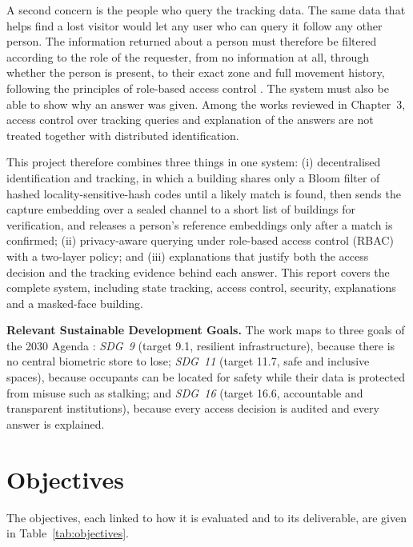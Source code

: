 \documentclass[12pt,a4paper,oneside]{report}
\begin{document}
A second concern is the people who query the tracking data. The same data that helps find a lost visitor would let any user who can query it follow any other person. The information returned about a person must therefore be filtered according to the role of the requester, from no information at all, through whether the person is present, to their exact zone and full movement history, following the principles of role-based access control \cite{ref21}. The system must also be able to show why an answer was given. Among the works reviewed in Chapter~3, access control over tracking queries and explanation of the answers are not treated together with distributed identification.

This project therefore combines three things in one system: (i) decentralised identification and tracking, in which a building shares only a Bloom filter of hashed locality-sensitive-hash codes until a likely match is found, then sends the capture embedding over a sealed channel to a short list of buildings for verification, and releases a person's reference embeddings only after a match is confirmed; (ii) privacy-aware querying under role-based access control (RBAC) with a two-layer policy; and (iii) explanations that justify both the access decision and the tracking evidence behind each answer. This report covers the complete system, including state tracking, access control, security, explanations and a masked-face building.

\textbf{Relevant Sustainable Development Goals.} The work maps to three goals of the 2030 Agenda \cite{ref27}: \emph{SDG~9} (target 9.1, resilient infrastructure), because there is no central biometric store to lose; \emph{SDG~11} (target 11.7, safe and inclusive spaces), because occupants can be located for safety while their data is protected from misuse such as stalking; and \emph{SDG~16} (target 16.6, accountable and transparent institutions), because every access decision is audited and every answer is explained.

\section{Objectives}
The objectives, each linked to how it is evaluated and to its deliverable, are given in Table~\ref{tab:objectives}.
\end{document}

